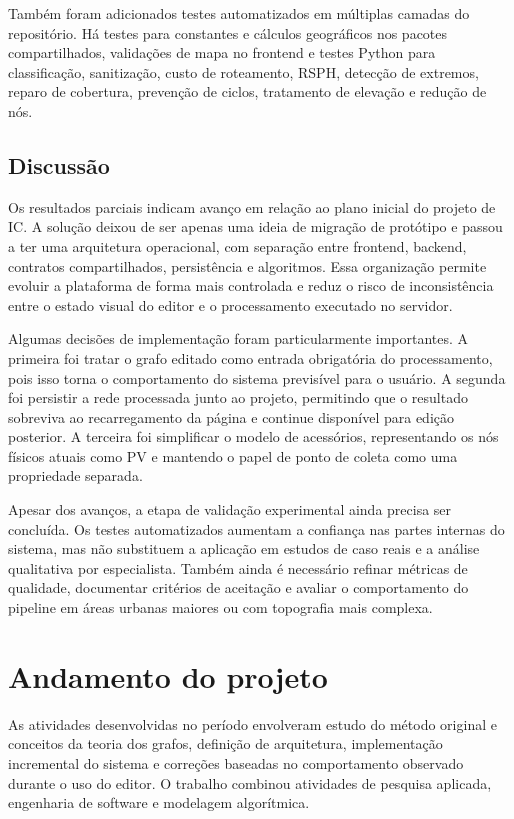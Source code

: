 \documentclass[12pt,a4paper]{article}
\begin{document}
Também foram adicionados testes automatizados em múltiplas camadas do repositório. Há testes para constantes e cálculos geográficos nos pacotes compartilhados, validações de mapa no frontend e testes Python para classificação, sanitização, custo de roteamento, RSPH, detecção de extremos, reparo de cobertura, prevenção de ciclos, tratamento de elevação e redução de nós.

\subsection{Discussão}

Os resultados parciais indicam avanço em relação ao plano inicial do projeto de IC.
A solução deixou de ser apenas uma ideia de migração de protótipo e passou a ter uma arquitetura operacional, com separação entre frontend, backend, contratos compartilhados, persistência e algoritmos.
Essa organização permite evoluir a plataforma de forma mais controlada e reduz o risco de inconsistência entre o estado visual do editor e o processamento executado no servidor.

Algumas decisões de implementação foram particularmente importantes.
A primeira foi tratar o grafo editado como entrada obrigatória do processamento, pois isso torna o comportamento do sistema previsível para o usuário.
A segunda foi persistir a rede processada junto ao projeto, permitindo que o resultado sobreviva ao recarregamento da página e continue disponível para edição posterior.
A terceira foi simplificar o modelo de acessórios, representando os nós físicos atuais como PV e mantendo o papel de ponto de coleta como uma propriedade separada.

Apesar dos avanços, a etapa de validação experimental ainda precisa ser concluída.
Os testes automatizados aumentam a confiança nas partes internas do sistema, mas não substituem a aplicação em estudos de caso reais e a análise qualitativa por especialista.
Também ainda é necessário refinar métricas de qualidade, documentar critérios de aceitação e avaliar o comportamento do pipeline em áreas urbanas maiores ou com topografia mais complexa.

\section{Andamento do projeto}

As atividades desenvolvidas no período envolveram estudo do método original e conceitos da teoria dos grafos, definição de arquitetura, implementação incremental do sistema e correções baseadas no comportamento observado durante o uso do editor.
O trabalho combinou atividades de pesquisa aplicada, engenharia de software e modelagem algorítmica.
\end{document}
